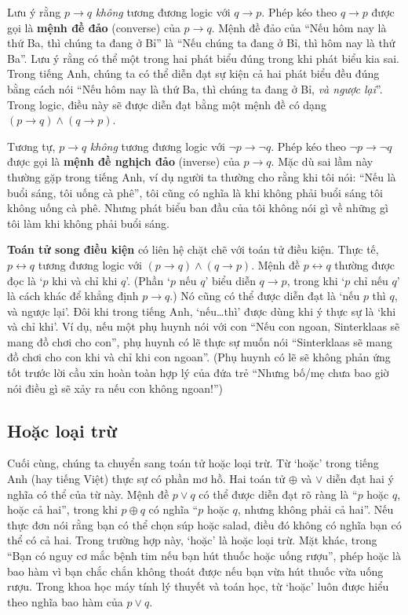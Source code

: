 Lưu ý rằng $p \to q$ \emph{không} tương đương logic với $q \to p$. Phép kéo theo $q \to p$ được gọi là \textbf{mệnh đề đảo} (converse) của $p \to q$. Mệnh đề đảo của ``Nếu hôm nay là thứ Ba, thì chúng ta đang ở Bỉ'' là ``Nếu chúng ta đang ở Bỉ, thì hôm nay là thứ Ba''. Lưu ý rằng có thể một trong hai phát biểu đúng trong khi phát biểu kia sai. Trong tiếng Anh, chúng ta có thể diễn đạt sự kiện cả hai phát biểu đều đúng bằng cách nói ``Nếu hôm nay là thứ Ba, thì chúng ta đang ở Bỉ, \emph{và ngược lại}''. Trong logic, điều này sẽ được diễn đạt bằng một mệnh đề có dạng $(p \to q) \land (q \to p)$.

Tương tự, $p \to q$ \emph{không} tương đương logic với $\lnot p \to \lnot q$. Phép kéo theo $\lnot p \to \lnot q$ được gọi là \textbf{mệnh đề nghịch đảo} (inverse) của $p \to q$. Mặc dù sai lầm này thường gặp trong tiếng Anh, ví dụ người ta thường cho rằng khi tôi nói: ``Nếu là buổi sáng, tôi uống cà phê'', tôi cũng có nghĩa là khi không phải buổi sáng tôi không uống cà phê. Nhưng phát biểu ban đầu của tôi không nói gì về những gì tôi làm khi không phải buổi sáng.

\textbf{Toán tử song điều kiện} có liên hệ chặt chẽ với toán tử điều kiện. Thực tế, $p \leftrightarrow q$ tương đương logic với $(p \to q) \land (q \to p)$. Mệnh đề $p \leftrightarrow q$ thường được đọc là `$p$ khi và chỉ khi $q$'. (Phần `$p$ nếu $q$' biểu diễn $q \to p$, trong khi `$p$ chỉ nếu $q$' là cách khác để khẳng định $p \to q$.) Nó cũng có thể được diễn đạt là `nếu $p$ thì $q$, và ngược lại'. Đôi khi trong tiếng Anh, `nếu\ldots thì' được dùng khi ý thực sự là `khi và chỉ khi'. Ví dụ, nếu một phụ huynh nói với con ``Nếu con ngoan, Sinterklaas sẽ mang đồ chơi cho con'', phụ huynh có lẽ thực sự muốn nói ``Sinterklaas sẽ mang đồ chơi cho con khi và chỉ khi con ngoan''. (Phụ huynh có lẽ sẽ không phản ứng tốt trước lời cầu xin hoàn toàn hợp lý của đứa trẻ ``Nhưng bố/mẹ chưa bao giờ nói điều gì sẽ xảy ra nếu con không ngoan!'')

\subsection{Hoặc loại trừ}

Cuối cùng, chúng ta chuyển sang toán tử hoặc loại trừ. Từ `hoặc' trong tiếng Anh (hay tiếng Việt) thực sự có phần mơ hồ. Hai toán tử $\oplus$ và $\lor$ diễn đạt hai ý nghĩa có thể của từ này. Mệnh đề $p \lor q$ có thể được diễn đạt rõ ràng là ``$p$ hoặc $q$, hoặc cả hai'', trong khi $p \oplus q$ có nghĩa ``$p$ hoặc $q$, nhưng không phải cả hai''. Nếu thực đơn nói rằng bạn có thể chọn súp hoặc salad, điều đó không có nghĩa bạn có thể có cả hai. Trong trường hợp này, `hoặc' là hoặc loại trừ. Mặt khác, trong ``Bạn có nguy cơ mắc bệnh tim nếu bạn hút thuốc hoặc uống rượu'', phép hoặc là bao hàm vì bạn chắc chắn không thoát được nếu bạn vừa hút thuốc vừa uống rượu. Trong khoa học máy tính lý thuyết và toán học, từ `hoặc' luôn được hiểu theo nghĩa bao hàm của $p \lor q$.

